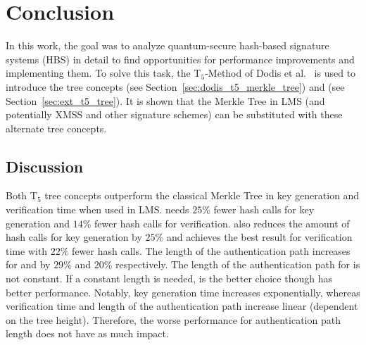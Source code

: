 \chapter{Conclusion}
\label{cha:conclusion}

In this work, the goal was to analyze quantum-secure hash-based signature systems (HBS) in detail to find opportunities for performance improvements and implementing them. 
To solve this task, the T$_5$-Method of Dodis et al.~\cite{T5_paper} is used to introduce the tree concepts \tftree (see Section~\ref{sec:dodis_t5_merkle_tree}) and \extree (see Section~\ref{sec:ext_t5_tree}). 
It is shown that the Merkle Tree in LMS (and potentially XMSS and other signature schemes) can be substituted with these alternate tree concepts.

\section{Discussion}
Both T$_5$ tree concepts outperform the classical Merkle Tree in key generation and verification time when used in LMS. \tftree needs $25\%$ fewer hash calls for key generation and $14\%$ fewer hash calls for verification. \extree also reduces the amount of hash calls for key generation by $25\%$ and achieves the best result for verification time with $22\%$ fewer hash calls.
The length of the authentication path increases for \tftree and \extree by $29\%$ and $20\%$ respectively. The length of the authentication path for \extree is not constant. If a constant length is needed, \tftree is the better choice though \extree has better performance.
Notably, key generation time increases exponentially, whereas verification time and length of the authentication path increase linear (dependent on the tree height). Therefore, the worse performance for authentication path length does not have as much impact. 

